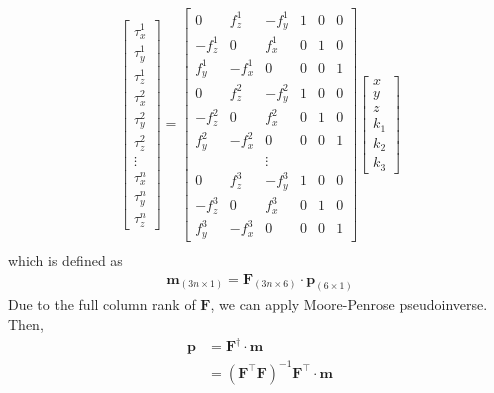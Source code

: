 \begin{equation}
\begin{split}
\begin{bmatrix}
\tau _x^1	\\
\tau _y^1	\\
\tau _z^1	\\
\tau _x^2	\\
\tau _y^2	\\
\tau _z^2	\\
\vdots\\
\tau _x^n	\\
\tau _y^n	\\
\tau _z^n	
\end{bmatrix}
=
\begin{bmatrix}
0			&f_z^1		&-f_y^1		&1	&0	&0\\
-f_z^1		&0			&f_x^1		&0	&1	&0\\
f_y^1		&-f_x^1		&0			&0	&0	&1\\
0			&f_z^2		&-f_y^2		&1	&0	&0\\
-f_z^2		&0			&f_x^2		&0	&1	&0\\
f_y^2		&-f_x^2		&0			&0	&0	&1\\
 			& 			&\vdots		& 	& 	& \\
0			&f_z^3		&-f_y^3		&1	&0	&0\\
-f_z^3		&0			&f_x^3		&0	&1	&0\\
f_y^3		&-f_x^3		&0			&0	&0	&1
\end{bmatrix}
\begin{bmatrix}
x\\
y\\
z\\
k_1\\
k_2\\
k_3
\end{bmatrix}\\
\end{split}
\end{equation}
which is defined as 
\begin{equation*}
\begin{split}
\boldsymbol{m}_{\left(3n \times 1\right)} = \mathbf{F}_{\left(3n \times 6\right)} \cdot \boldsymbol{p}_{\left(6 \times 1\right)}
\end{split}
\end{equation*}
Due to the full column rank of $\mathbf{F}$, we can apply Moore-Penrose pseudoinverse. Then, 
\begin{equation*}
\begin{split}
\boldsymbol{p} 	&= \mathbf{F}^{\dagger} \cdot \boldsymbol{m}\\
				&= \left( \mathbf{F}^\top\mathbf{F}\right) ^{-1}\mathbf{F}^\top \cdot \boldsymbol{m}
\end{split}
\end{equation*}
